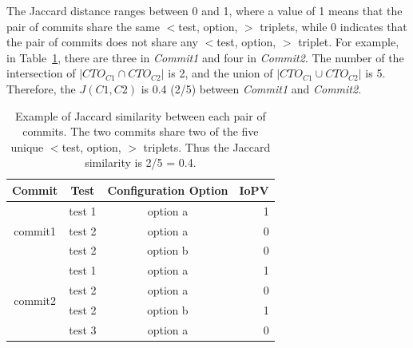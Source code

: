 The Jaccard distance ranges %
between 0 %
and 1, where a value of 1 means that the pair of commits share the same $<$test, option, \inconsistent$>$ triplets, while 0 indicates that the pair of commits does not share any $<$test, option, \inconsistent$>$ triplet. For example, in Table~\ref{tab:jaccard}, there are three \instance in \emph{Commit1} and four \instance in \emph{Commit2}. The number of the intersection of $|CTO_{C1} \cap CTO_{C2}|$ is 2, and the union of $|CTO_{C1} \cup CTO_{C2}|$ is 5. Therefore, the $J(C1,C2)$ is 0.4 (2/5) between \emph{Commit1} and \emph{Commit2}. %


\begin{table}[t]
\centering
\caption{Example of Jaccard similarity between each pair of commits. The two commits share two of the five unique $<$test, option, \inconsistent$>$ triplets. Thus the Jaccard similarity is 2/5 = 0.4.}
\begin{tabular}{|c|c|c|r|}
\hline
Commit                   & Test   & Configuration Option     & \multicolumn{1}{c|}{IoPV} \\ \hline
\multirow{3}{*}{commit1} & test 1  & option   a & 1                         \\ \cline{2-4} 
                         & test 2  & option   a & 0                         \\ \cline{2-4} 
                         & test 2  & option   b & 0                         \\ \hline
\multirow{4}{*}{commit2} & test 1 & option   a & 1                         \\ \cline{2-4} 
                         & test 2 & option   a & 0                         \\ \cline{2-4} 
                         & test 2 & option   b & 1                         \\ \cline{2-4} 
                         & test 3 & option   a & 0                         \\ \hline
\end{tabular}
\label{tab:jaccard}
\end{table}


